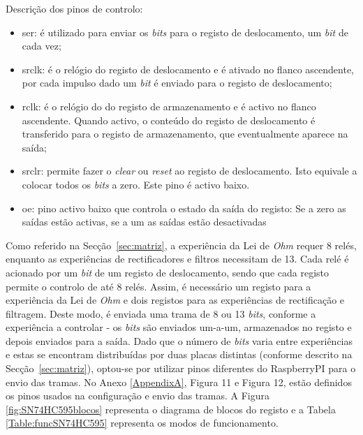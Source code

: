 Descrição dos pinos de controlo:
\begin{itemize}
    \item \acrfull{ser}: é utilizado para enviar os \textit{bits} para o registo de deslocamento, um \textit{bit} de cada vez;

    \item \acrfull{srclk}: é o relógio do registo de deslocamento e é ativado no flanco ascendente, por cada impulso dado um \textit{bit} é enviado para o registo de deslocamento;

    \item \acrfull{rclk}: é o relógio do do registo de armazenamento e é activo no flanco ascendente. Quando activo, o conteúdo do registo de deslocamento é transferido para o registo de armazenamento, que eventualmente aparece na saída;

    \item \acrfull{srclr}: permite fazer o \textit{clear} ou \textit{reset} ao registo de deslocamento. Isto equivale a colocar todos os \textit{bits} a zero. Este pino é activo baixo.

    \item \acrfull{oe}: pino activo baixo que controla o estado da saída do registo: Se a zero as saídas estão activas, se a um as saídas estão desactivadas
\end{itemize}

Como referido na Secção~\ref{sec:matriz}, a experiência da Lei de \textit{Ohm} requer 8 relés, enquanto as experiências de rectificadores e filtros necessitam de 13. Cada relé é acionado por um \textit{bit} de um registo de deslocamento, sendo que cada registo permite o controlo de até 8 relés. Assim, é necessário um registo para a experiência da Lei de \textit{Ohm} e dois registos para as experiências de rectificação e filtragem.
Deste modo, é enviada uma trama de 8 ou 13 \textit{bits}, conforme a experiência a controlar - os \textit{bits} são enviados um-a-um, armazenados no registo e depois enviados para a saída. Dado que o número de \textit{bits} varia entre experiências e estas se encontram distribuídas por duas placas distintas (conforme descrito na Secção~\ref{sec:matriz}), optou-se por utilizar pinos diferentes do \gls{RaspberryPI} para o envio das tramas. No Anexo \ref{AppendixA}, Figura 11 e Figura 12, estão definidos os pinos usados na configuração e envio das tramas. A Figura \ref{fig:SN74HC595blocos} representa o diagrama de blocos do registo e a Tabela \ref{Table:funcSN74HC595} representa os modos de funcionamento.

